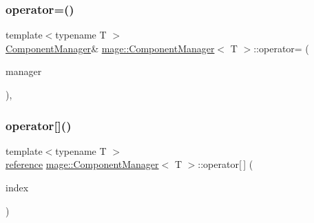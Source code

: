 \subsubsection{\texorpdfstring{operator=()}{operator=()}\hspace{0.1cm}{\footnotesize\ttfamily [2/2]}}
{\footnotesize\ttfamily template$<$typename T $>$ \\
\mbox{\hyperlink{classmage_1_1_component_manager}{Component\+Manager}}\& \mbox{\hyperlink{classmage_1_1_component_manager}{mage\+::\+Component\+Manager}}$<$ T $>$\+::operator= (\begin{DoxyParamCaption}\item[{\mbox{\hyperlink{classmage_1_1_component_manager}{Component\+Manager}}$<$ T $>$ \&\&}]{manager }\end{DoxyParamCaption})\hspace{0.3cm}{\ttfamily [default]}, {\ttfamily [noexcept]}}

\mbox{\label{classmage_1_1_component_manager_a6216d62333ef2eafa8b64a6e8d67aa4e}} 
\subsubsection{\texorpdfstring{operator[]()}{operator[]()}\hspace{0.1cm}{\footnotesize\ttfamily [1/2]}}
{\footnotesize\ttfamily template$<$typename T $>$ \\
\mbox{\hyperlink{classmage_1_1_component_manager_a4daeb292f527534c155e359faf7eaf80}{reference}} \mbox{\hyperlink{classmage_1_1_component_manager}{mage\+::\+Component\+Manager}}$<$ T $>$\+::operator\mbox{[}$\,$\mbox{]} (\begin{DoxyParamCaption}\item[{\mbox{\hyperlink{classmage_1_1_component_manager_a6bd219525db9ec9f3adb9259e52674da}{size\+\_\+type}}}]{index }\end{DoxyParamCaption})\hspace{0.3cm}{\ttfamily [noexcept]}}

\mbox{\label{classmage_1_1_component_manager_accbb5b12be0fcc026e44de16dd1fe1c0}} 
